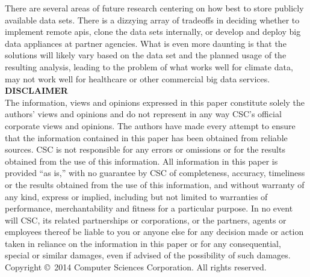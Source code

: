 There are several areas of future research centering on how best to store publicly available data sets. There is a dizzying array of tradeoffs in deciding whether to implement remote \gls{api}s, clone the data sets internally, or develop and deploy big data appliances at partner agencies. What is even more daunting is that the solutions will likely vary based on the data set and the planned usage of the resulting analysis, leading to the problem of what works well for climate data, may not work well for healthcare or other commercial big data services.\\

\textbf{DISCLAIMER}\\

The information, views and opinions expressed in this paper constitute solely the authors’ views and opinions and do not represent in any way CSC’s official corporate views and opinions. The authors have made every attempt to ensure that the information contained in this paper has been obtained from reliable sources. CSC is not responsible for any errors or omissions or for the results obtained from the use of this information. All information in this paper is provided “as is,” with no guarantee by CSC of completeness, accuracy, timeliness or the results obtained from the use of this information, and without warranty of any kind, express or implied, including but not limited to warranties of performance, merchantability and fitness for a particular purpose. In no event will CSC, its related partnerships or corporations, or the partners, agents or employees thereof be liable to you or anyone else for any decision made or action taken in reliance on the information in this paper or for any consequential, special or similar damages, even if advised of the possibility of such damages.\\

Copyright \copyright~2014 Computer Sciences Corporation. All rights reserved.
